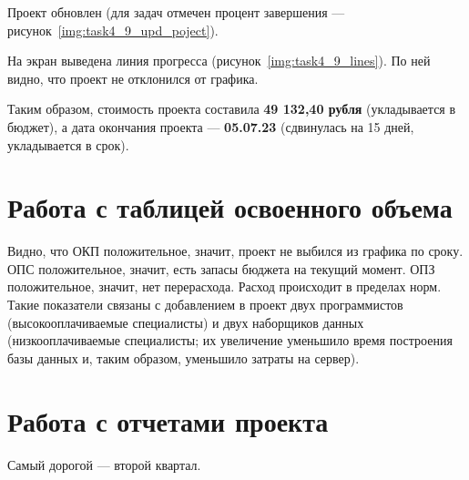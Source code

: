 


Проект обновлен (для задач отмечен процент завершения --- рисунок~\ref{img:task4_9_upd_poject}).

На экран выведена линия прогресса (рисунок~\ref{img:task4_9_lines}). По ней видно, что проект не отклонился от графика.

Таким образом, стоимость проекта составила \textbf{49 132,40 рубля} (укладывается в бюджет), а дата окончания проекта --- \textbf{05.07.23} (сдвинулась на 15 дней, 
укладывается в срок).


\section{Работа с таблицей освоенного объема}



Видно, что ОКП положительное, значит, проект не выбился из графика по сроку. ОПС положительное, значит, 
есть запасы бюджета на текущий момент. ОПЗ положительное, значит, нет перерасхода. Расход происходит в пределах норм. Такие показатели связаны с добавлением в проект двух программистов (высокооплачиваемые специалисты) и двух наборщиков данных (низкооплачиваемые специалисты; их увеличение уменьшило время построения базы данных и, таким образом, уменьшило затраты на сервер).

\newpage
\section{Работа с отчетами проекта}


Самый дорогой --- второй квартал.


